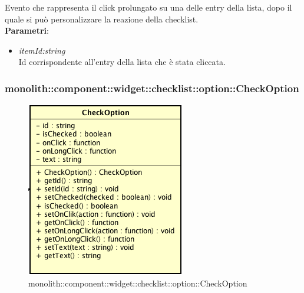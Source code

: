 \begin{itemize}
\begin{itemize}
	Evento che rappresenta il click prolungato su una delle entry della lista, dopo il quale si può personalizzare la reazione della checklist.
		\\ \textbf{Parametri}: \begin{itemize}
		\item \textit{itemId:string}\\
		Id corrispondente all'entry della lista che è stata cliccata.
		\end{itemize} 
	\end{itemize}
\end{itemize}

\subsubsection{monolith::component::widget::checklist::option::CheckOption}

\label{monolith::component::widget::checklist::option::CheckOption}
\begin{figure}[H]
	\centering
	\includegraphics[scale=0.5]{Sezioni/SottosezioniST/img/CheckOption.png}
	\caption{monolith::component::widget::checklist::option::CheckOption}
\end{figure}


